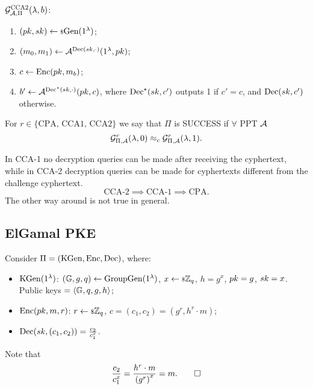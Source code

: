 \begin{definition}
	$\mathcal{G}_{\mathcal{A}, \Pi}^{\text{CCA{2}}}(\lambda, b)$:
	\begin{enumerate}
		\item $(pk, sk) \leftarrow {\scriptstyle \$} {\mathrm{Gen}(1^{\lambda})}$;
		\item $(m_0, m_1) \leftarrow \mathcal{A}^{\mathrm{Dec}(sk, \cdot)}(1^{\lambda}, pk)$;
		\item $c \leftarrow \mathrm{Enc}(pk, m_b)$;
		\item $b' \leftarrow \mathcal{A}^{\mathrm{Dec}^{\star}(sk, \cdot)}(pk, c)$, where $\mathrm{Dec}^{\star}(sk, c')$ outputs 1 if $c' = c$, and $\mathrm{Dec}(sk, c')$ otherwise. \qedhere
	\end{enumerate}
\end{definition}

For $r \in \{ \text{CPA, CCA1, CCA2} \}$ we say that $\Pi$ is SUCCESS if $\forall$ \ac{PPT} $\mathcal{A}$
\begin{equation*}
	\mathcal{G}^{r}_{\Pi, \mathcal{A}} (\lambda, 0) \approx_c \mathcal{G}^{r}_{\Pi, \mathcal{A}} (\lambda, 1).
\end{equation*}

In \ac{CCA}-1 no decryption queries can be made after receiving the cyphertext, while in \ac{CCA}-2 decryption queries can be made for cyphertexts different from the challenge cyphertext.
\begin{equation*}
	\text{CCA-2} \implies \text{CCA-1} \implies \text{CPA}.
\end{equation*}
The other way around is not true in general.

\subsection{ElGamal \acs{PKE}}

\begin{construction}[ElGamal] \label{cons:elgamal}
	Consider $\Pi = (\mathrm{KGen}, \mathrm{Enc}, \mathrm{Dec})$, where:
	\begin{itemize}
		\item $\mathrm{KGen}(1^{\lambda})$: $(\mathbb{G} , \allowbreak g , \allowbreak q) \leftarrow \mathrm{GroupGen}(1^{\lambda})$, $x \leftarrow {\scriptstyle \$} {\mathbb{Z}_q}$, $h = g^x$, $pk = g$, $sk = x$.
			Public keys $= \left< \mathbb{G}, q, g, h \right>$;
		\item $\mathrm{Enc}(pk, m, r)$: $r \leftarrow {\scriptstyle \$} {\mathbb{Z}_q}$, $c = (c_1, c_2) = (g^r, h^r \cdot m)$;
		\item $\mathrm{Dec}(sk, (c_1, c_2)) = \frac{c_2}{c_1^x}$.
	\end{itemize}
	Note that
	\begin{equation*}
		\frac{c_2}{c_1^x} = \frac{h^r \cdot m}{\left( g^r \right)^x} = m. \qedhere
	\end{equation*}
\end{construction}


